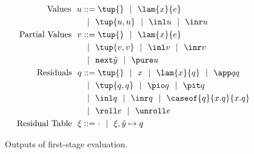 
\begin{figure}
\begin{abstrsyn}
\[\begin{aligned}
\text{Values}\ \ 
u &::= \tup{}
 \gbar \lam {\var}{e} \\
&\gbar \tup{u, u}
 \gbar \inl u 
 \gbar \inr u \\
\text{Partial Values}\ \ 
v &::= \tup{}
 \gbar \lam {\var}{\expr} \\
&\gbar \tup{v, v}
 \gbar \inl v 
 \gbar \inr v \\
&\gbar \next {\hat y}
 \gbar \pure u \\
\text{Residuals}\ \ 
q &::= \tup{}\gbar\var%
 \gbar \lam {\var}{q} 
 \gbar \app q q \\
&\gbar \tup{q, q} 
 \gbar \pio q 
 \gbar \pit q \\
&\gbar \inl q 
 \gbar \inr q
 \gbar \caseof {q}{\var.q}{\var.q} \\
&\gbar \roll e
 \gbar \unroll e\\
\text{Residual Table}\ \ 
\xi &::= \cdot
 \gbar \xi, {\hat y} \mapsto q \\
\end{aligned}\]
\end{abstrsyn}
\caption{Outputs of first-stage evaluation.}
\label{fig:values}
\end{figure}


